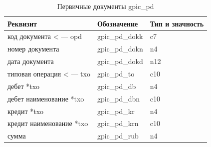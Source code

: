 \begin{table}[h!]
    \centering
    \scriptsize
    \caption{Первичные документы gpic\_pd}
    \begin{tabular}{|l|l|l|} 

\hline
\textbf{Реквизит}           &\textbf{Обозначение}   &\textbf{Тип и значность}   \\ \hline
код документа < --- opd     &gpic\_pd\_dokk         &c7                         \\ \hline
номер документа             &gpic\_pd\_dokn         &n4                         \\ \hline
дата документа              &gpic\_pd\_dokd         &n12                        \\ \hline
типовая операция < --- txo  &gpic\_pd\_to           &c10                        \\ \hline
дебет *txo                  &gpic\_pd\_db           &n4                         \\ \hline
дебет наименование *txo     &gpic\_pd\_dbn          &c10                        \\ \hline
кредит *txo                 &gpic\_pd\_kr           &n4                         \\ \hline
кредит наименование *txo    &gpic\_pd\_krn          &c10                        \\ \hline
сумма                       &gpic\_pd\_rub          &n4                         \\ \hline

    \end{tabular}
\end{table}

